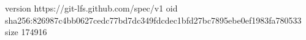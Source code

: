 version https://git-lfs.github.com/spec/v1
oid sha256:826987c4bb0627cedc77bd7dc349fdcdec1bfd27bc7895ebe0ef1983fa780533
size 174916
